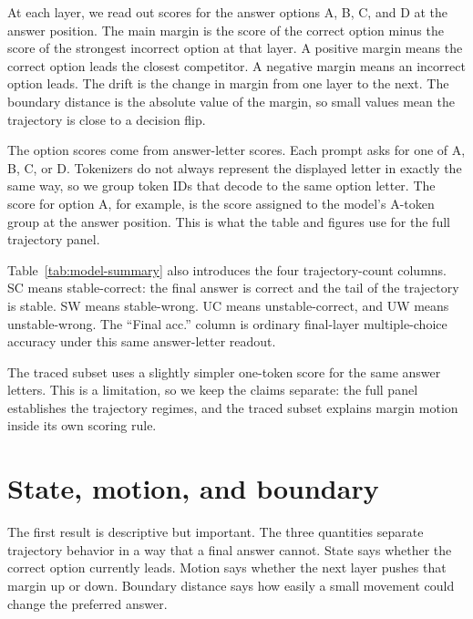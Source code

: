 \documentclass[10pt,twocolumn]{article}
\begin{document}
At each layer, we read out scores for the answer options A, B, C, and D at the answer position. The main margin is the score of the correct option minus the score of the strongest incorrect option at that layer. A positive margin means the correct option leads the closest competitor. A negative margin means an incorrect option leads. The drift is the change in margin from one layer to the next. The boundary distance is the absolute value of the margin, so small values mean the trajectory is close to a decision flip.

The option scores come from answer-letter scores. Each prompt asks for one of A, B, C, or D. Tokenizers do not always represent the displayed letter in exactly the same way, so we group token IDs that decode to the same option letter. The score for option A, for example, is the score assigned to the model's A-token group at the answer position. This is what the table and figures use for the full trajectory panel.

Table~\ref{tab:model-summary} also introduces the four trajectory-count columns. SC means stable-correct: the final answer is correct and the tail of the trajectory is stable. SW means stable-wrong. UC means unstable-correct, and UW means unstable-wrong. The ``Final acc.'' column is ordinary final-layer multiple-choice accuracy under this same answer-letter readout.

\begin{table}[t]
\centering
\small
\resizebox{\columnwidth}{!}{\setlength{\tabcolsep}{3.5pt}}
\caption{\textbf{Design and coverage.} SC, SW, UC, and UW are stable-correct, stable-wrong, unstable-correct, and unstable-wrong. Final acc. is final-layer multiple-choice accuracy. Drift $R^2$ is the held-out one-step attention and MLP accounting score.}
\label{tab:model-summary}
\end{table}

The traced subset uses a slightly simpler one-token score for the same answer letters. This is a limitation, so we keep the claims separate: the full panel establishes the trajectory regimes, and the traced subset explains margin motion inside its own scoring rule.

\section{State, motion, and boundary}

The first result is descriptive but important. The three quantities separate trajectory behavior in a way that a final answer cannot. State says whether the correct option currently leads. Motion says whether the next layer pushes that margin up or down. Boundary distance says how easily a small movement could change the preferred answer.
\end{document}
